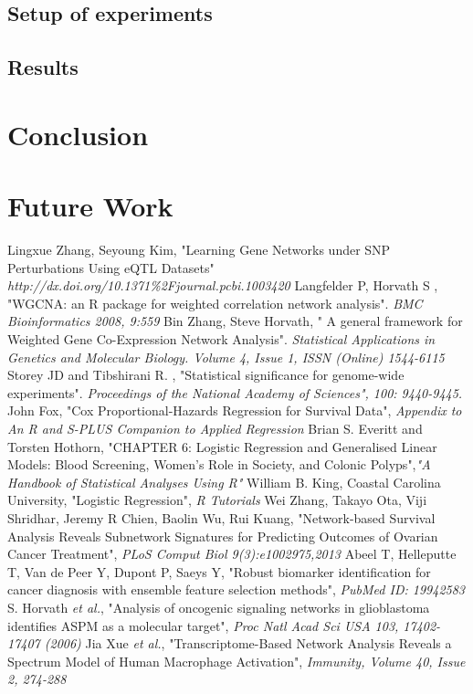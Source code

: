 \documentclass{ba-kecs}
\numberwithin{figure}{section}
\numberwithin{equation}{section}
\begin{document}
\subsection{Setup of experiments}
\subsection{Results}

\section{Conclusion}

\section{Future Work}




\begin{thebibliography}{99}
 Lingxue Zhang, Seyoung Kim, "Learning Gene Networks under SNP Perturbations Using eQTL Datasets" \emph{http://dx.doi.org/10.1371\%2Fjournal.pcbi.1003420}
 Langfelder P, Horvath S , "WGCNA: an R package for weighted correlation network analysis". \emph{BMC Bioinformatics 2008, 9:559}
 Bin Zhang, Steve Horvath, " A general framework for Weighted Gene Co-Expression Network Analysis". \emph{Statistical Applications in Genetics and Molecular Biology. Volume 4, Issue 1, ISSN (Online) 1544-6115}
 Storey JD and Tibshirani R. , "Statistical significance for genome-wide experiments".\emph{ Proceedings of the National Academy of Sciences", 100: 9440-9445.}
 John Fox, "Cox Proportional-Hazards Regression for Survival Data", \emph{Appendix to An R and S-PLUS Companion to Applied Regression}
 Brian S. Everitt and Torsten Hothorn, "CHAPTER 6: Logistic Regression and Generalised Linear Models: Blood Screening, Women’s Role in Society, and Colonic Polyps",\emph{"A Handbook of Statistical Analyses Using R"}
 William B. King, Coastal Carolina University, "Logistic Regression", \emph{R Tutorials} 
 Wei Zhang, Takayo Ota, Viji Shridhar, Jeremy R Chien, Baolin Wu, Rui Kuang, "Network-based Survival Analysis Reveals Subnetwork Signatures for Predicting Outcomes of Ovarian Cancer Treatment", \emph{PLoS Comput Biol 9(3):e1002975,2013}
 Abeel T, Helleputte T, Van de Peer Y, Dupont P, Saeys Y, "Robust biomarker identification for cancer diagnosis with ensemble feature selection methods", \emph{PubMed ID: 19942583}
 S. Horvath \emph{et al.}, "Analysis of oncogenic signaling networks in glioblastoma identifies ASPM as a molecular target", \emph{Proc Natl Acad Sci USA 103, 17402-17407 (2006)}
 Jia Xue \emph{et al.}, "Transcriptome-Based Network Analysis Reveals a Spectrum Model of Human Macrophage Activation", \emph{Immunity, Volume 40, Issue 2, 274-288}
\end{thebibliography}

\appendix
\end{document}
